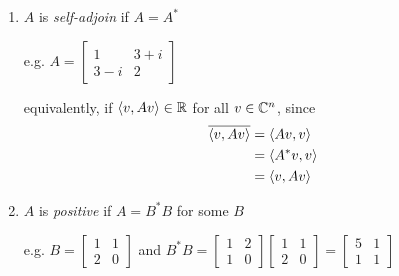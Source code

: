 \begin{enumerate}[label=\arabic*.]
    \item $A$ is \emph{self-adjoin} if $A = A^*$

          e.g. $A = \begin{bmatrix}1 & 3 + i\\3 - i & 2\end{bmatrix}$

          equivalently, if $\left\langle v, Av\right\rangle\in\mathbb{R}$ for all $v \in \mathbb{C}^n$, since
          \begin{align*}\overline{\left\langle v, Av\right\rangle}
               & = \left\langle Av, v\right\rangle   \\
               & = \left\langle A^*v, v\right\rangle \\
               & = \left\langle v, Av\right\rangle
          \end{align*}
    \item $A$ is \emph{positive} if $A = B^*B$ for some $B$

          e.g. $B = \begin{bmatrix}1 & 1\\2 & 0\end{bmatrix}$ and $B^*B = \begin{bmatrix}1 & 2\\1 & 0\end{bmatrix}\begin{bmatrix}1 & 1\\2 & 0\end{bmatrix} = \begin{bmatrix}5 & 1\\1 & 1\end{bmatrix}$


\end{enumerate}
